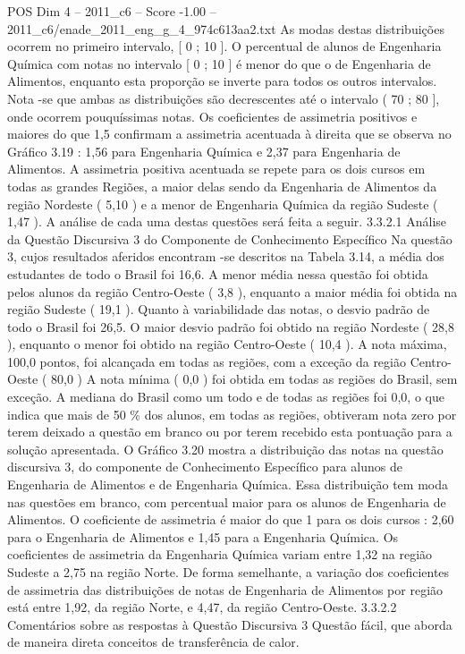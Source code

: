 \begin{textsample}{POS Dim 4 – 2011\_c6 – Score -1.00 – 2011\_c6/enade\_2011\_eng\_g\_4\_974c613aa2.txt}
As modas destas distribuições ocorrem no primeiro intervalo, [ 0 ; 10 ].
O percentual de alunos de Engenharia Química com notas no intervalo [ 0 ; 10 ] é menor do que o de Engenharia de Alimentos, enquanto esta proporção se inverte para todos os outros intervalos.
Nota -se que ambas as distribuições são decrescentes até o intervalo ( 70 ; 80 ], onde ocorrem pouquíssimas notas.
Os coeficientes de assimetria positivos e maiores do que 1,5 confirmam a assimetria acentuada à direita que se observa no Gráfico 3.19 : 1,56 para Engenharia Química e 2,37 para Engenharia de Alimentos.
A assimetria positiva acentuada se repete para os dois cursos em todas as grandes Regiões, a maior delas sendo da Engenharia de Alimentos da região Nordeste ( 5,10 ) e a menor de Engenharia Química da região Sudeste ( 1,47 ).
A análise de cada uma destas questões será feita a seguir. 3.3.2.1 Análise da Questão Discursiva 3 do Componente de Conhecimento Específico Na questão 3, cujos resultados aferidos encontram -se descritos na Tabela 3.14, a média dos estudantes de todo o Brasil foi 16,6.
A menor média nessa questão foi obtida pelos alunos da região Centro-Oeste ( 3,8 ), enquanto a maior média foi obtida na região Sudeste ( 19,1 ).
Quanto à variabilidade das notas, o desvio padrão de todo o Brasil foi 26,5.
O maior desvio padrão foi obtido na região Nordeste ( 28,8 ), enquanto o menor foi obtido na região Centro-Oeste ( 10,4 ).
A nota máxima, 100,0 pontos, foi alcançada em todas as regiões, com a exceção da região Centro-Oeste ( 80,0 ) A nota mínima ( 0,0 ) foi obtida em todas as regiões do Brasil, sem exceção.
A mediana do Brasil como um todo e de todas as regiões foi 0,0, o que indica que mais de 50 \% dos alunos, em todas as regiões, obtiveram nota zero por terem deixado a questão em branco ou por terem recebido esta pontuação para a solução apresentada.
O Gráfico 3.20 mostra a distribuição das notas na questão discursiva 3, do componente de Conhecimento Específico para alunos de Engenharia de Alimentos e de Engenharia Química.
Essa distribuição tem moda nas questões em branco, com percentual maior para os alunos de Engenharia de Alimentos.
O coeficiente de assimetria é maior do que 1 para os dois cursos : 2,60 para o Engenharia de Alimentos e 1,45 para a Engenharia Química.
Os coeficientes de assimetria da Engenharia Química variam entre 1,32 na região Sudeste a 2,75 na região Norte.
De forma semelhante, a variação dos coeficientes de assimetria das distribuições de notas de Engenharia de Alimentos por região está entre 1,92, da região Norte, e 4,47, da região Centro-Oeste. 3.3.2.2 Comentários sobre as respostas à Questão Discursiva 3 Questão fácil, que aborda de maneira direta conceitos de transferência de calor.

\end{textsample}
